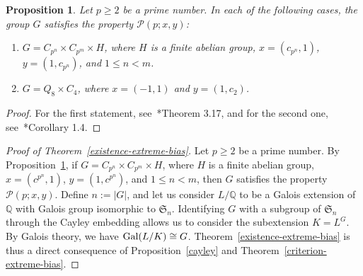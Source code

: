 \documentclass[12pt]{amsart}
\numberwithin{equation}{section}
\newcommand{\Gal}{{\rm Gal}}
\newcommand{\Q}{\mathbb Q}
\newtheorem{prop}[X]{Proposition}
\theoremstyle{definition}
\theoremstyle{remark}
\begin{document}
\begin{prop}\label{examplespropertyP}
    Let $p\ge2$ be a prime number. In each of the following cases, the group $G$ satisfies the property $\mathcal{P}(p;x,y)$:
    \begin{enumerate}
        \item $G=C_{p^n}\times C_{p^m}\times H$, where $H$ is a finite abelian group, $x=\left(c_{p^n},1\right)$, $y=\left(1,c_{p^n}\right)$, and $1\le n<m$.
        \item $G=Q_8\times C_4$, where $x=(-1,1)$ and $y=(1,c_2)$.
    \end{enumerate}
\end{prop}
\begin{proof}
    For the first statement, see~\cite{Hay}*{Theorem 3.17}, and for the second one, see~\cite{Hay}*{Corollary 1.4}.
\end{proof}
\begin{proof}[Proof of Theorem~\ref{existence-extreme-bias}]
    Let $p\ge2$ be a prime number. By Proposition~\ref{examplespropertyP}, if $G=C_{p^n}\times C_{p^m}\times H$, where $H$ is a finite abelian group, $x=\left(c^{p^n},1\right)$, $y=\left(1,c^{p^n}\right)$, and $1\le n<m$, then $G$ satisfies the property $\mathcal{P}(p;x,y)$. Define $n:=|G|$, and let us consider $L/\Q$ to be a Galois extension of $\Q$ with Galois group isomorphic to $\mathfrak{S}_n$. Identifying $G$ with a subgroup of $\mathfrak{S}_n$ through the Cayley embedding allows us to consider the subextension $K=L^G$. By Galois theory, we have $\Gal(L/K)\cong G$. Theorem~\ref{existence-extreme-bias} is thus a direct consequence of Proposition~\ref{cayley} and Theorem~\ref{criterion-extreme-bias}.
\end{proof}
\end{document}
